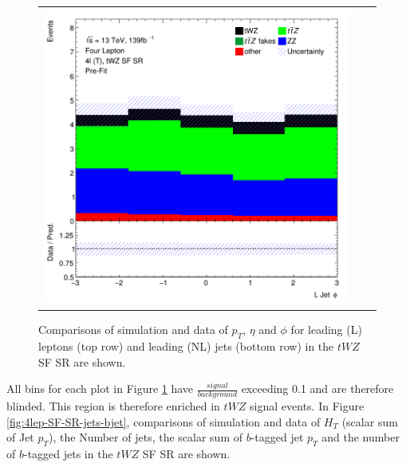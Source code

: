 \begin{figure}[htbp]
\begin{tabular}{ccc}
    \includegraphics[width=.25\textwidth]{figures/PreFitPlots/lep4_tWZ_4T_SF_LJet_phi.png} \\

  \end{tabular}
    \caption{Comparisons of simulation and data of $p_{T}$, $\eta$ and $\phi$ for leading (L) leptons (top row) and leading (NL) jets (bottom row) in the $tWZ$ SF SR are shown.}
  \label{fig:4lep-SF-SR-leptonPlots}
\end{figure}All bins for each plot in Figure \ref{fig:4lep-SF-SR-leptonPlots} have $\frac{signal}{background}$ exceeding 0.1 and are therefore blinded. This region is therefore enriched in $tWZ$ signal events. In Figure \ref{fig:4lep-SF-SR-jets-bjet}, comparisons of simulation and data of $H_{T}$ (scalar sum of Jet $p_{T}$), the Number of jets, the scalar sum of $b$-tagged jet $p_{T}$ and the number of $b$-tagged jets in the $tWZ$ SF SR are shown.
